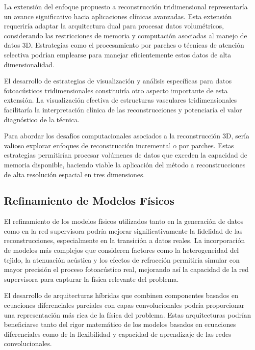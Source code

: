 La extensión del enfoque propuesto a reconstrucción tridimensional representaría un avance significativo hacia aplicaciones clínicas avanzadas. Esta extensión requeriría adaptar la arquitectura dual para procesar datos volumétricos, considerando las restricciones de memoria y computación asociadas al manejo de datos 3D. Estrategias como el procesamiento por parches o técnicas de atención selectiva podrían emplearse para manejar eficientemente estos datos de alta dimensionalidad.

El desarrollo de estrategias de visualización y análisis específicas para datos fotoacústicos tridimensionales constituiría otro aspecto importante de esta extensión. La visualización efectiva de estructuras vasculares tridimensionales facilitaría la interpretación clínica de las reconstrucciones y potenciaría el valor diagnóstico de la técnica.

Para abordar los desafíos computacionales asociados a la reconstrucción 3D, sería valioso explorar enfoques de reconstrucción incremental o por parches. Estas estrategias permitirían procesar volúmenes de datos que exceden la capacidad de memoria disponible, haciendo viable la aplicación del método a reconstrucciones de alta resolución espacial en tres dimensiones.

\subsection{Refinamiento de Modelos Físicos}

El refinamiento de los modelos físicos utilizados tanto en la generación de datos como en la red supervisora podría mejorar significativamente la fidelidad de las reconstrucciones, especialmente en la transición a datos reales. La incorporación de modelos más complejos que consideren factores como la heterogeneidad del tejido, la atenuación acústica y los efectos de refracción permitiría simular con mayor precisión el proceso fotoacústico real, mejorando así la capacidad de la red supervisora para capturar la física relevante del problema.

El desarrollo de arquitecturas híbridas que combinen componentes basados en ecuaciones diferenciales parciales con capas convolucionales podría proporcionar una representación más rica de la física del problema. Estas arquitecturas podrían beneficiarse tanto del rigor matemático de los modelos basados en ecuaciones diferenciales como de la flexibilidad y capacidad de aprendizaje de las redes convolucionales.

